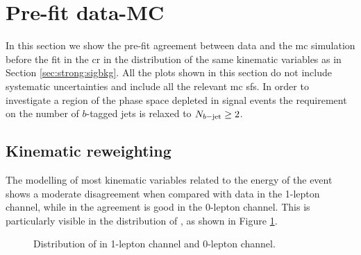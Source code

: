 %
\section{Pre-fit data-MC}
\label{sec:strong:dataMC}
In this section we show the pre-fit agreement between data and the \gls{mc} simulation before the fit in the \gls{cr}
in the distribution of the same kinematic variables as in Section \ref{sec:strong:sigbkg}. 
All the plots shown in this section do not include systematic uncertainties and include all the relevant \gls{mc} \glspl{sf}. 
In order to investigate a region of the phase space depleted in signal events the requirement on the number
of $b$-tagged jets is relaxed to $N_{b\mathrm{-jet}} \geq 2$. 

\subsection{Kinematic reweighting}
\label{sec:strong:kinrw}

The modelling of most kinematic variables related to the energy of the event shows a moderate disagreement 
when compared with data in the 1-lepton channel, while in the agreement is good in the 0-lepton channel. 
This is particularly visible in the distribution of \meff, as shown in Figure \ref{fig:strong:datamc:meff_prerw}.

\begin{figure}[h]
\centering 
{}
\caption{Distribution of \meff in  1-lepton channel and 
0-lepton channel.
}
\label{fig:strong:datamc:meff_prerw}
\end{figure}

